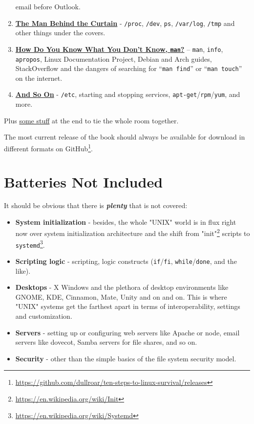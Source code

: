 \documentclass[10pt,american,]{book}
\renewcommand{\href}[2]{#2\footnote{\url{#1}}}
\numberwithin{figure}{chapter}
\begin{document}
\begin{enumerate}
  email before Outlook.
\item
  \protect\hyperlink{the-man-behind-the-curtain}{\textbf{The Man Behind
  the Curtain}} - \texttt{/proc}, \texttt{/dev}, \texttt{ps},
  \texttt{/var/log}, \texttt{/tmp} and other things under the covers.
\item
  \protect\hyperlink{how-do-you-know-what-you-dont-know-man}{\textbf{How
  Do You Know What You Don’t Know, \texttt{man}?}} – \texttt{man},
  \texttt{info}, \texttt{apropos}, Linux Documentation Project, Debian
  and Arch guides, StackOverflow and the dangers of searching for
  “\texttt{man\ find}” or “\texttt{man\ touch}” on the internet.
\item
  \protect\hyperlink{and-so-on}{\textbf{And So On}} - \texttt{/etc},
  starting and stopping services,
  \texttt{apt-get}/\texttt{rpm}/\texttt{yum}, and more.
\end{enumerate}

Plus \protect\hyperlink{appendices}{some stuff} at the end to tie the
whole room together.

The most current release of the book should always be available for
download in different formats on
\href{https://github.com/dullroar/ten-steps-to-linux-survival/releases}{GitHub}.

\section*{Batteries Not Included}\label{batteries-not-included}

It should be obvious that there is \textbf{\emph{plenty}} that is not
covered:

\begin{itemize}
\item
  \textbf{System initialization} - besides, the whole "UNIX" world is in
  flux right now over system initialization architecture and the shift
  from \href{https://en.wikipedia.org/wiki/Init}{"init"} scripts to
  \href{https://en.wikipedia.org/wiki/Systemd}{\texttt{systemd}}.
\item
  \textbf{Scripting logic} - scripting, logic constructs
  (\texttt{if}/\texttt{fi}, \texttt{while}/\texttt{done}, and the like).
\item
  \textbf{Desktops} - X Windows and the plethora of desktop environments
  like GNOME, KDE, Cinnamon, Mate, Unity and on and on. This is where
  "UNIX" systems get the farthest apart in terms of interoperability,
  settings and customization.
\item
  \textbf{Servers} - setting up or configuring web servers like Apache
  or node, email servers like dovecot, Samba servers for file shares,
  and so on.
\item
  \textbf{Security} - other than the simple basics of the file system
  security model.
\end{itemize}
\end{document}
